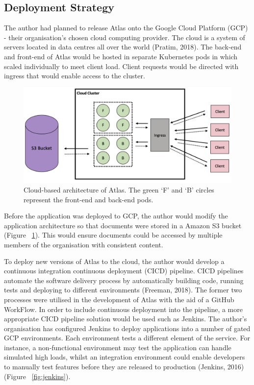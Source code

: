 \documentclass{article}
\begin{document}
\subsection{Deployment Strategy}
The author had planned to release Atlas onto the Google Cloud Platform (GCP) - their organisation's chosen cloud computing provider. The cloud is a system of servers located in data centres all over the world (Pratim, 2018). The back-end and front-end of Atlas would be hosted in separate Kubernetes pods in which scaled individually to meet client load. Client requests would be directed with ingress that would enable access to the cluster.

\begin{figure}[!b]
  \centering
      \includegraphics[width=1\textwidth]{images/deployment.png}
  \caption{Cloud-based architecture of Atlas. The green ‘F’ and ‘B’ circles represent the front-end and back-end pods.}
  \label{fig:deploy}
\end{figure}

Before the application was deployed to GCP, the author would modify the application architecture so that documents were stored in a Amazon S3 bucket (Figure ~\ref{fig:deploy}). This would ensure documents could be accessed by multiple members of the organisation with consistent content.

To deploy new versions of Atlas to the cloud, the author would develop a continuous integration continuous deployment (CICD) pipeline. CICD pipelines automate the software delivery process by automatically building code, running tests and deploying to different environments (Freeman, 2018). The former two processes were utilised in the development of Atlas with the aid of a GitHub WorkFlow. In order to include continuous deployment into the pipeline, a more appropriate CICD pipeline solution would be used such as Jenkins. The author's organisation has configured Jenkins to deploy applications into a number of gated GCP environments. Each environment tests a different element of the service. For instance, a non-functional environment may test the application can handle simulated high loads, whilst an integration environment could enable developers to manually test features before they are released to production (Jenkins, 2016) (Figure ~\ref{fig:jenkins}).
\end{document}

